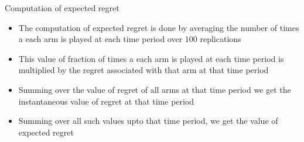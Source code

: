 \documentclass[compress, serif, onlymath, professionalfonts]{beamer}
\begin{document}
\begin{frame}{Computation of expected regret}
\begin{itemize}
\item The computation of expected regret is done by averaging the number of times a each arm is played at each time period over $100$ replications
\item This value of fraction of times a each arm is played at each time period is multiplied by the regret associated with that arm at that time period
\item Summing over the value of regret of all arms at that time period we get the instantaneous value of regret at that time period
\item Summing over all such values upto that time period, we get the value of expected regret
\end{itemize}

\end{frame}
\end{document}

